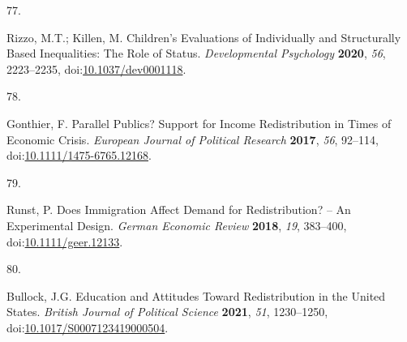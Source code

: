 \documentclass[
  12pt,
  letterpaper,
]{article}
\newlength{\cslhangindent}
\newlength{\csllabelwidth}
\newenvironment{CSLReferences}[2] %
 {\begin{list}{}{%
  \setlength{\itemindent}{0pt}
  \setlength{\leftmargin}{0pt}
  \setlength{\parsep}{0pt}
  \ifodd #1
   \setlength{\leftmargin}{\cslhangindent}
   \setlength{\itemindent}{-1\cslhangindent}
  \fi
  \setlength{\itemsep}{#2\baselineskip}}}
 {\end{list}}
\newcommand{\CSLLeftMargin}[1]{\parbox[t]{\csllabelwidth}{\strut#1\strut}}
\newcommand{\CSLRightInline}[1]{\parbox[t]{\linewidth - \csllabelwidth}{\strut#1\strut}}
\begin{document}
\begin{CSLReferences}{0}{0}
\CSLLeftMargin{77. }%
\CSLRightInline{Rizzo, M.T.; Killen, M. Children's Evaluations of
Individually and Structurally Based Inequalities: {The} Role of Status.
\emph{Developmental Psychology} \textbf{2020}, \emph{56}, 2223--2235,
doi:\href{https://doi.org/10.1037/dev0001118}{10.1037/dev0001118}.}

\CSLLeftMargin{78. }%
\CSLRightInline{Gonthier, F. Parallel Publics? {Support} for Income
Redistribution in Times of Economic Crisis. \emph{European Journal of
Political Research} \textbf{2017}, \emph{56}, 92--114,
doi:\href{https://doi.org/10.1111/1475-6765.12168}{10.1111/1475-6765.12168}.}

\CSLLeftMargin{79. }%
\CSLRightInline{Runst, P. Does {Immigration Affect Demand} for
{Redistribution}? -- {An Experimental Design}. \emph{German Economic
Review} \textbf{2018}, \emph{19}, 383--400,
doi:\href{https://doi.org/10.1111/geer.12133}{10.1111/geer.12133}.}

\CSLLeftMargin{80. }%
\CSLRightInline{Bullock, J.G. Education and {Attitudes} Toward
{Redistribution} in the {United States}. \emph{British Journal of
Political Science} \textbf{2021}, \emph{51}, 1230--1250,
doi:\href{https://doi.org/10.1017/S0007123419000504}{10.1017/S0007123419000504}.}

\end{CSLReferences}
\end{document}
